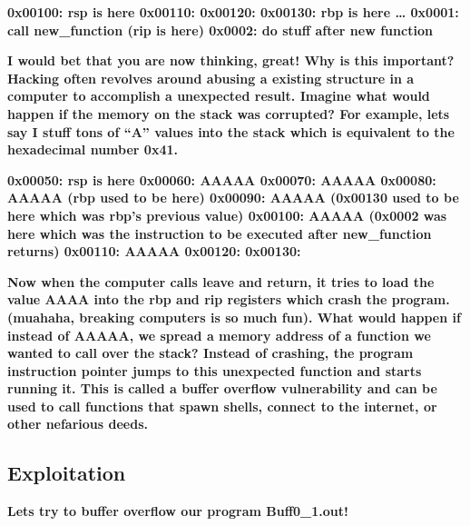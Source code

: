 \documentclass[letterpaper]{article}
\begin{document}
\textbf{0x00100: rsp is here\newline
0x00110:\newline
0x00120:\newline
0x00130: rbp is here\newline
{\dots}\newline
0x0001: call new\_function\newline
(rip is here)\newline
0x0002: do stuff after new function}

\textbf{I would bet that you are now thinking, great! Why is this important? Hacking often revolves around abusing a
existing structure in a computer to accomplish a unexpected result. Imagine what would happen if the memory on the
stack was corrupted? For example, lets say I stuff tons of ``A'' values into the stack which is equivalent to the
hexadecimal number 0x41.}

\textbf{0x00050: rsp is here\newline
0x00060: AAAAA\newline
0x00070: AAAAA\newline
0x00080: AAAAA (rbp used to be here)\newline
0x00090: AAAAA (0x00130 used to be here which was rbp's previous value)\newline
0x00100: AAAAA (0x0002 was here which was the instruction to be executed after new\_function returns)\newline
0x00110: AAAAA\newline
0x00120:\newline
0x00130:}

\textbf{Now when the computer calls leave and return, it tries to load the value AAAA into the rbp and rip registers
which crash the program. (muahaha, breaking computers is so much fun). What would happen if instead of AAAAA, we spread
a memory address of a function we wanted to call over the stack? Instead of crashing, the program instruction pointer
jumps to this unexpected function and starts running it. This is called a buffer overflow vulnerability and can be used
to call functions that spawn shells, connect to the internet, or other nefarious deeds.}

\subsection{Exploitation}

\textbf{Lets try to buffer overflow our program Buff0\_1.out!}
\end{document}
